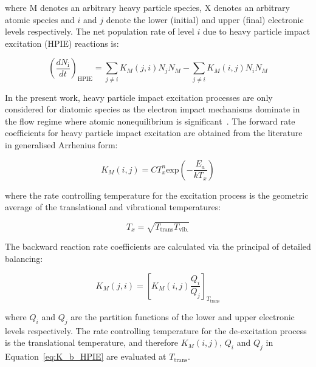 \noindent where M denotes an arbitrary heavy particle species, X denotes an arbitrary atomic species and $i$ and $j$ denote the lower (initial) and upper (final) electronic levels respectively.
The net population rate of level $i$ due to heavy particle impact excitation (HPIE) reactions is:

\begin{equation}
 \left ( \frac{dN_\text{i}}{dt} \right )_\text{HPIE} =  \sum_{j \neq i} K_{M}(j,i) N_{j} N_{M} - \sum_{j \neq i} K_{M} (i,j) N_{i} N_{M} 
\end{equation}

\par

In the present work, heavy particle impact excitation processes are only considered for diatomic species as the electron impact mechanisms dominate in the flow regime where atomic nonequilibrium is significant~\cite{park_1990,JohnPhd}.
The forward rate coefficients for heavy particle impact excitation are obtained from the literature in generalised Arrhenius form:

\begin{equation}
 K_{M}(i,j) = C T_x^n \text{exp} \left ( - \frac{E_a}{k T_x} \right ) \label{eq:CR_GA}
\end{equation}

\noindent where the rate controlling temperature for the excitation process is the geometric average of the translational and vibrational temperatures:

\begin{equation}
 T_x = \sqrt{T_\text{trans} T_\text{vib.}}
\end{equation}

The backward reaction rate coefficients are calculated via the principal of detailed balancing:

\begin{equation}
 K_{M}(j,i) = \left [ K_{M}(i,j) \frac{Q_i}{Q_j} \right ]_{T_\text{trans}} \label{eq:K_b_HPIE}
\end{equation}

\noindent where $Q_i$ and $Q_j$ are the partition functions of the lower and upper electronic levels respectively.
The rate controlling temperature for the de-excitation process is the translational temperature, and therefore $K_{M}(i,j)$, $Q_i$ and $Q_j$ in Equation~\ref{eq:K_b_HPIE} are evaluated at $T_\text{trans}$. 


